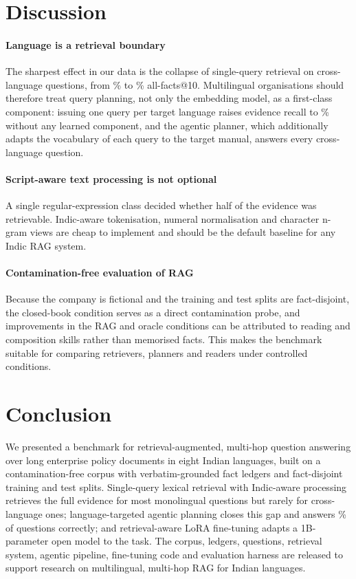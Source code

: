 \documentclass[preprint,12pt]{elsarticle}
\begin{document}
\section{Discussion}
\label{sec:discussion}

\paragraph{Language is a retrieval boundary} The sharpest effect in our data is the collapse of single-query retrieval on cross-language questions, from \RAllTen\% to \RXLTen\% all-facts@10. Multilingual organisations should therefore treat query planning, not only the embedding model, as a first-class component: issuing one query per target language raises evidence recall to \RXLLFTen\% without any learned component, and the agentic planner, which additionally adapts the vocabulary of each query to the target manual, answers every cross-language question.

\paragraph{Script-aware text processing is not optional} A single regular-expression class decided whether half of the evidence was retrievable. Indic-aware tokenisation, numeral normalisation and character n-gram views are cheap to implement and should be the default baseline for any Indic RAG system.

\paragraph{Contamination-free evaluation of RAG} Because the company is fictional and the training and test splits are fact-disjoint, the closed-book condition serves as a direct contamination probe, and improvements in the RAG and oracle conditions can be attributed to reading and composition skills rather than memorised facts. This makes the benchmark suitable for comparing retrievers, planners and readers under controlled conditions.

\section{Conclusion}
\label{sec:conclusion}
We presented a benchmark for retrieval-augmented, multi-hop question answering over long enterprise policy documents in eight Indian languages, built on a contamination-free corpus with verbatim-grounded fact ledgers and fact-disjoint training and test splits. Single-query lexical retrieval with Indic-aware processing retrieves the full evidence for most monolingual questions but rarely for cross-language ones; language-targeted agentic planning closes this gap and answers \AStrict\% of questions correctly; and retrieval-aware LoRA fine-tuning adapts a 1B-parameter open model to the task. The corpus, ledgers, questions, retrieval system, agentic pipeline, fine-tuning code and evaluation harness are released to support research on multilingual, multi-hop RAG for Indian languages.
\end{document}
